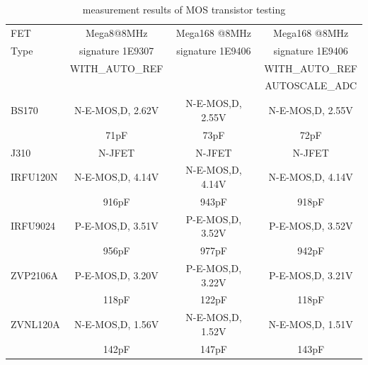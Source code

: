 \begin{table}[H]
  \begin{center}
    \begin{tabular}{| l | c | c | c |}
    \hline
     FET & Mega8@8MHz & Mega168 @8MHz & Mega168 @8MHz \\
    Type    & signature 1E9307 & signature 1E9406 & signature 1E9406 \\
           & WITH\_AUTO\_REF &  & WITH\_AUTO\_REF \\
           &                 &  & AUTOSCALE\_ADC \\
    \hline
    \hline
BS170 & N-E-MOS,D, 2.62V & N-E-MOS,D, 2.55V & N-E-MOS,D, 2.55V \\
      &  71pF             &  73pF  &  72pF \\
    \hline
J310 & N-JFET & N-JFET & N-JFET\\
    \hline
IRFU120N & N-E-MOS,D, 4.14V & N-E-MOS,D, 4.14V & N-E-MOS,D, 4.14V\\
     & 916pF  & 943pF  & 918pF \\
    \hline
IRFU9024 & P-E-MOS,D, 3.51V & P-E-MOS,D, 3.52V & P-E-MOS,D, 3.52V\\
     & 956pF & 977pF & 942pF \\
    \hline
ZVP2106A & P-E-MOS,D, 3.20V & P-E-MOS,D, 3.22V & P-E-MOS,D, 3.21V\\
  & 118pF & 122pF & 118pF \\
    \hline
ZVNL120A & N-E-MOS,D, 1.56V & N-E-MOS,D, 1.52V & N-E-MOS,D, 1.51V \\
  & 142pF & 147pF  & 143pF \\
    \hline
    \end{tabular}
  \end{center}
  \caption{measurement results of MOS transistor testing}
  \label{tab:mos} 
\end{table}
